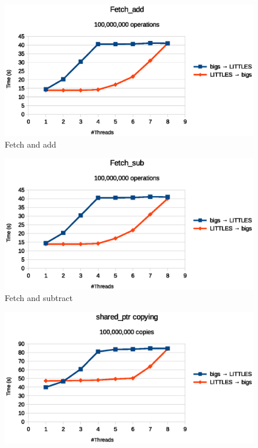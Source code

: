 \documentclass[11pt]{book}
\begin{document}
\begin{figure}
  \begin{minipage}{.5\textwidth}
    \begin{center}
      \includegraphics[width=\textwidth,keepaspectratio,quiet]{figs/big_little/fetchadd.eps} \\
      Fetch and add \\
    \end{center}
  \end{minipage}%
  \hfill
  \begin{minipage}{.5\textwidth}
    \begin{center}
      \includegraphics[width=\textwidth,keepaspectratio,quiet]{figs/big_little/fetchsub.eps} \\
      Fetch and subtract \\
    \end{center}
  \end{minipage}%
  \hfill
  \begin{minipage}{.5\textwidth}
    \begin{center}
      \includegraphics[width=\textwidth,keepaspectratio,quiet]{figs/big_little/sharedptr_copy.eps} \\

\end{center}
\end{minipage}
\end{figure}
\end{document}
